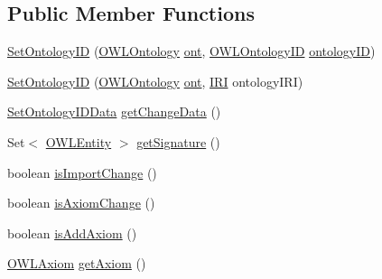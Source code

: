 \subsection*{Public Member Functions}
\begin{DoxyCompactItemize}
\item 
\hyperlink{classorg_1_1semanticweb_1_1owlapi_1_1model_1_1_set_ontology_i_d_a9543f80b8a025830acaa78721b8737f7}{Set\-Ontology\-I\-D} (\hyperlink{interfaceorg_1_1semanticweb_1_1owlapi_1_1model_1_1_o_w_l_ontology}{O\-W\-L\-Ontology} \hyperlink{classorg_1_1semanticweb_1_1owlapi_1_1model_1_1_o_w_l_ontology_change_a9b8b64f1cab33aae500db20e19186211}{ont}, \hyperlink{classorg_1_1semanticweb_1_1owlapi_1_1model_1_1_o_w_l_ontology_i_d}{O\-W\-L\-Ontology\-I\-D} \hyperlink{classorg_1_1semanticweb_1_1owlapi_1_1model_1_1_set_ontology_i_d_a632351a7e9ea2b61edc290f5c2adf57f}{ontology\-I\-D})
\item 
\hyperlink{classorg_1_1semanticweb_1_1owlapi_1_1model_1_1_set_ontology_i_d_a60dda79c048f40d87ff79a256b8e98e4}{Set\-Ontology\-I\-D} (\hyperlink{interfaceorg_1_1semanticweb_1_1owlapi_1_1model_1_1_o_w_l_ontology}{O\-W\-L\-Ontology} \hyperlink{classorg_1_1semanticweb_1_1owlapi_1_1model_1_1_o_w_l_ontology_change_a9b8b64f1cab33aae500db20e19186211}{ont}, \hyperlink{classorg_1_1semanticweb_1_1owlapi_1_1model_1_1_i_r_i}{I\-R\-I} ontology\-I\-R\-I)
\item 
\hyperlink{classorg_1_1semanticweb_1_1owlapi_1_1change_1_1_set_ontology_i_d_data}{Set\-Ontology\-I\-D\-Data} \hyperlink{classorg_1_1semanticweb_1_1owlapi_1_1model_1_1_set_ontology_i_d_a435c4667454ebdf0e93b519d4cc840b3}{get\-Change\-Data} ()
\item 
Set$<$ \hyperlink{interfaceorg_1_1semanticweb_1_1owlapi_1_1model_1_1_o_w_l_entity}{O\-W\-L\-Entity} $>$ \hyperlink{classorg_1_1semanticweb_1_1owlapi_1_1model_1_1_set_ontology_i_d_ab8f85837dacf6e207f46ec9a7e332331}{get\-Signature} ()
\item 
boolean \hyperlink{classorg_1_1semanticweb_1_1owlapi_1_1model_1_1_set_ontology_i_d_af69f6c81ab7db7f0690c23ad59a21efc}{is\-Import\-Change} ()
\item 
boolean \hyperlink{classorg_1_1semanticweb_1_1owlapi_1_1model_1_1_set_ontology_i_d_aa532565d97af69ea06026a750f75ee78}{is\-Axiom\-Change} ()
\item 
boolean \hyperlink{classorg_1_1semanticweb_1_1owlapi_1_1model_1_1_set_ontology_i_d_a9f9cc830ed4a680b75fd4f0efc88d78e}{is\-Add\-Axiom} ()
\item 
\hyperlink{interfaceorg_1_1semanticweb_1_1owlapi_1_1model_1_1_o_w_l_axiom}{O\-W\-L\-Axiom} \hyperlink{classorg_1_1semanticweb_1_1owlapi_1_1model_1_1_set_ontology_i_d_aea94e6e22bf6c5b0156d38d1fa8f3318}{get\-Axiom} ()

\end{DoxyCompactItemize}
